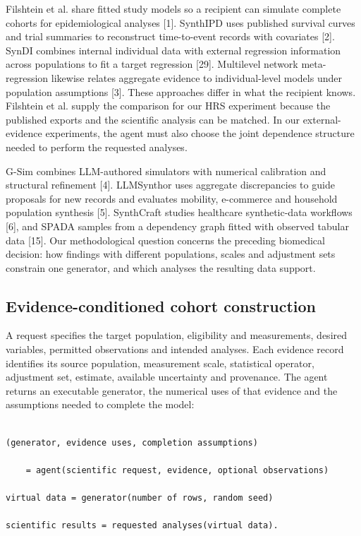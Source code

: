 \documentclass[sigconf,review]{acmart}
\begin{document}
Filshtein et al. share fitted study models so a recipient can simulate complete cohorts for epidemiological analyses [1]. SynthIPD uses published survival curves and trial summaries to reconstruct time-to-event records with covariates [2]. SynDI combines internal individual data with external regression information across populations to fit a target regression [29]. Multilevel network meta-regression likewise relates aggregate evidence to individual-level models under population assumptions [3]. These approaches differ in what the recipient knows. Filshtein et al. supply the comparison for our HRS experiment because the published exports and the scientific analysis can be matched. In our external-evidence experiments, the agent must also choose the joint dependence structure needed to perform the requested analyses.


G-Sim combines LLM-authored simulators with numerical calibration and structural refinement [4]. LLMSynthor uses aggregate discrepancies to guide proposals for new records and evaluates mobility, e-commerce and household population synthesis [5]. SynthCraft studies healthcare synthetic-data workflows [6], and SPADA samples from a dependency graph fitted with observed tabular data [15]. Our methodological question concerns the preceding biomedical decision: how findings with different populations, scales and adjustment sets constrain one generator, and which analyses the resulting data support.


\subsection{Evidence-conditioned cohort construction}

A request specifies the target population, eligibility and measurements, desired variables, permitted observations and intended analyses. Each evidence record identifies its source population, measurement scale, statistical operator, adjustment set, estimate, available uncertainty and provenance. The agent returns an executable generator, the numerical uses of that evidence and the assumptions needed to complete the model:


\noindent\begin{minipage}{\columnwidth}

\begin{lstlisting}

(generator, evidence uses, completion assumptions)

    = agent(scientific request, evidence, optional observations)

virtual data = generator(number of rows, random seed)

scientific results = requested analyses(virtual data).

\end{lstlisting}

\end{minipage}
\end{document}
